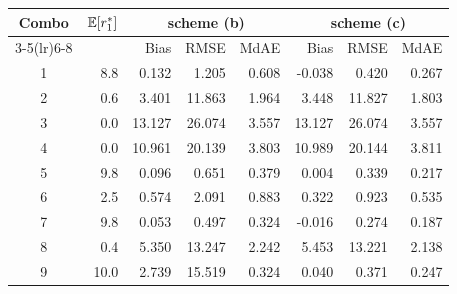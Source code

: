 \begin{tabular}{crrrrrrr}
\toprule
Combo & $\mathbb{E}[r_1^*]$ & \multicolumn{3}{c}{scheme (b)} & \multicolumn{3}{c}{scheme (c)} \\
\cmidrule(lr){3-5}\cmidrule(lr){6-8}
 & & Bias & RMSE & MdAE & Bias & RMSE & MdAE \\
1 & 8.8 & 0.132 & 1.205 & 0.608 & -0.038 & 0.420 & 0.267 \\
2 & 0.6 & 3.401 & 11.863 & 1.964 & 3.448 & 11.827 & 1.803 \\
3 & 0.0 & 13.127 & 26.074 & 3.557 & 13.127 & 26.074 & 3.557 \\
4 & 0.0 & 10.961 & 20.139 & 3.803 & 10.989 & 20.144 & 3.811 \\
5 & 9.8 & 0.096 & 0.651 & 0.379 & 0.004 & 0.339 & 0.217 \\
6 & 2.5 & 0.574 & 2.091 & 0.883 & 0.322 & 0.923 & 0.535 \\
7 & 9.8 & 0.053 & 0.497 & 0.324 & -0.016 & 0.274 & 0.187 \\
8 & 0.4 & 5.350 & 13.247 & 2.242 & 5.453 & 13.221 & 2.138 \\
9 & 10.0 & 2.739 & 15.519 & 0.324 & 0.040 & 0.371 & 0.247 \\
\bottomrule
\end{tabular}

